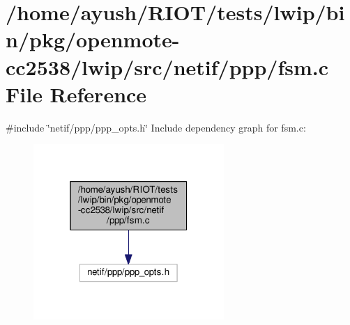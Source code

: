 \hypertarget{openmote-cc2538_2lwip_2src_2netif_2ppp_2fsm_8c}{}\section{/home/ayush/\+R\+I\+O\+T/tests/lwip/bin/pkg/openmote-\/cc2538/lwip/src/netif/ppp/fsm.c File Reference}
\label{openmote-cc2538_2lwip_2src_2netif_2ppp_2fsm_8c}
{\ttfamily \#include \char`\"{}netif/ppp/ppp\+\_\+opts.\+h\char`\"{}}\newline
Include dependency graph for fsm.\+c\+:
\nopagebreak
\begin{figure}[H]
\begin{center}
\leavevmode
\includegraphics[width=205pt]{openmote-cc2538_2lwip_2src_2netif_2ppp_2fsm_8c__incl}
\end{center}
\end{figure}
